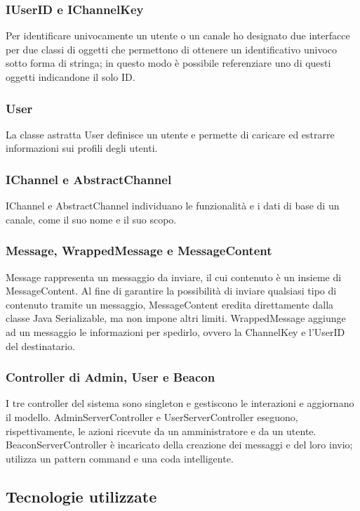 		\subsubsection{IUserID e IChannelKey}
	Per identificare univocamente un utente o un canale ho designato due interfacce per due classi di oggetti che permettono di ottenere un identificativo univoco sotto forma di stringa; in questo modo è possibile referenziare uno di questi oggetti indicandone il solo ID.\@

		\subsubsection{User}
	La classe astratta User definisce un utente e permette di caricare ed estrarre informazioni sui profili degli utenti.

		\subsubsection{IChannel e AbstractChannel}
	IChannel e AbstractChannel individuano le funzionalità e i dati di base di un canale, come il suo nome e il suo scopo.

		\subsubsection{Message, WrappedMessage e MessageContent}
	Message rappresenta un messaggio da inviare, il cui contenuto è un insieme di MessageContent. Al fine di garantire la possibilità di inviare qualsiasi tipo di contenuto tramite un messaggio, MessageContent eredita direttamente dalla classe Java Serializable, ma non impone altri limiti. WrappedMessage aggiunge ad un messaggio le informazioni per spedirlo, ovvero la ChannelKey e l'UserID del destinatario.

		\subsubsection{Controller di Admin, User e Beacon}
	I tre controller del sistema sono singleton e gestiscono le interazioni e aggiornano il modello. AdminServerController e UserServerController eseguono, rispettivamente, le azioni ricevute da un amministratore e da un utente. BeaconServerController è incaricato della creazione dei messaggi e del loro invio; utilizza un pattern command e una coda intelligente.

\subsection{Tecnologie utilizzate}
